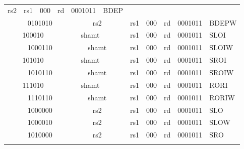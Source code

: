 \begin{table}[p]
\begin{small}
\begin{center}
\begin{tabular}{p{0in}p{0.4in}p{0.05in}p{0.05in}p{0.05in}p{0.05in}p{0.4in}p{0.6in}p{0.4in}p{0.6in}p{0.7in}l}
\multicolumn{2}{c|}{rs2} &
\multicolumn{1}{c|}{rs1} &
\multicolumn{1}{c|}{000} &
\multicolumn{1}{c|}{rd} &
\multicolumn{1}{c|}{0001011} & BDEP \\
%
\cline{2-11} &
\multicolumn{4}{|c|}{0101010} &
\multicolumn{2}{c|}{rs2} &
\multicolumn{1}{c|}{rs1} &
\multicolumn{1}{c|}{000} &
\multicolumn{1}{c|}{rd} &
\multicolumn{1}{c|}{0001011} & BDEPW \\
%
\cline{2-11} &
\multicolumn{3}{|c|}{\hphantom{00}100010} &
\multicolumn{3}{c|}{shamt} &
\multicolumn{1}{c|}{rs1} &
\multicolumn{1}{c|}{000} &
\multicolumn{1}{c|}{rd} &
\multicolumn{1}{c|}{0001011} & SLOI \\
%
\cline{2-11} &
\multicolumn{4}{|c|}{1000110} &
\multicolumn{2}{c|}{shamt} &
\multicolumn{1}{c|}{rs1} &
\multicolumn{1}{c|}{000} &
\multicolumn{1}{c|}{rd} &
\multicolumn{1}{c|}{0001011} & SLOIW \\
%
\cline{2-11} &
\multicolumn{3}{|c|}{\hphantom{00}101010} &
\multicolumn{3}{c|}{shamt} &
\multicolumn{1}{c|}{rs1} &
\multicolumn{1}{c|}{000} &
\multicolumn{1}{c|}{rd} &
\multicolumn{1}{c|}{0001011} & SROI \\
%
\cline{2-11} &
\multicolumn{4}{|c|}{1010110} &
\multicolumn{2}{c|}{shamt} &
\multicolumn{1}{c|}{rs1} &
\multicolumn{1}{c|}{000} &
\multicolumn{1}{c|}{rd} &
\multicolumn{1}{c|}{0001011} & SROIW \\
%
\cline{2-11} &
\multicolumn{3}{|c|}{\hphantom{00}111010} &
\multicolumn{3}{c|}{shamt} &
\multicolumn{1}{c|}{rs1} &
\multicolumn{1}{c|}{000} &
\multicolumn{1}{c|}{rd} &
\multicolumn{1}{c|}{0001011} & RORI \\
%
\cline{2-11} &
\multicolumn{4}{|c|}{1110110} &
\multicolumn{2}{c|}{shamt} &
\multicolumn{1}{c|}{rs1} &
\multicolumn{1}{c|}{000} &
\multicolumn{1}{c|}{rd} &
\multicolumn{1}{c|}{0001011} & RORIW \\
%
\cline{2-11} &
\multicolumn{4}{|c|}{1000000} &
\multicolumn{2}{c|}{rs2} &
\multicolumn{1}{c|}{rs1} &
\multicolumn{1}{c|}{000} &
\multicolumn{1}{c|}{rd} &
\multicolumn{1}{c|}{0001011} & SLO \\
%
\cline{2-11} &
\multicolumn{4}{|c|}{1000010} &
\multicolumn{2}{c|}{rs2} &
\multicolumn{1}{c|}{rs1} &
\multicolumn{1}{c|}{000} &
\multicolumn{1}{c|}{rd} &
\multicolumn{1}{c|}{0001011} & SLOW \\
%
\cline{2-11} &
\multicolumn{4}{|c|}{1010000} &
\multicolumn{2}{c|}{rs2} &
\multicolumn{1}{c|}{rs1} &
\multicolumn{1}{c|}{000} &
\multicolumn{1}{c|}{rd} &
\multicolumn{1}{c|}{0001011} & SRO \\
%
\cline{2-11} &

\end{tabular}
\end{center}
\end{small}
\end{table}

